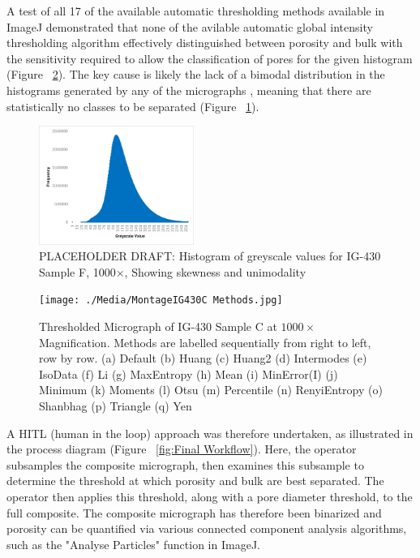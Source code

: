 \documentclass[3p,twocolumn]{elsarticle}
\begin{document}
A test of all 17 of the available automatic thresholding methods available in
ImageJ demonstrated that none of the avilable automatic global intensity
thresholding algorithm effectively distinguished between porosity and bulk
with the sensitivity required to allow the classification of pores for the
given histogram (Figure ~\ref{fig:Try All Thresholding Methods}). The key
cause is likely the lack of a bimodal distribution in the histograms generated
by any of the micrographs , meaning that there are statistically no classes to
be separated (Figure ~\ref{fig:histogramnobimodal}). 

    \begin{figure}
		\centering
    \includegraphics[width=0.45\textwidth]{./Media/IG430F Greyscale Histogram.png}
		\caption{PLACEHOLDER DRAFT: Histogram of greyscale values for IG-430 Sample F, 1000×, Showing skewness and unimodality}
		\label{fig:histogramnobimodal}
	\end{figure} 

	\begin{figure}[!htbp]
		\centering
		\texttt{[image: ./Media/MontageIG430C Methods.jpg]}
		\caption{Thresholded Micrograph of IG-430 Sample C at $1000\times$ Magnification. Methods are labelled sequentially from right to left, row by row. (a) Default
			(b) Huang
			(c) Huang2
			(d) Intermodes
			(e) IsoData
			(f) Li
			(g) MaxEntropy
			(h) Mean
			(i) MinError(I)
			(j) Minimum
			(k) Moments
			(l) Otsu
			(m) Percentile
			(n) RenyiEntropy
			(o) Shanbhag
			(p) Triangle
			(q) Yen}
		\label{fig:Try All Thresholding Methods}
	\end{figure}  

	A HITL (human in the loop) approach was therefore undertaken, as illustrated
	in the  process diagram (Figure ~\ref{fig:Final Workflow}). Here, the operator
	subsamples the composite micrograph, then examines this subsample to
	determine the threshold at which porosity and bulk are best separated. The
	operator then applies this threshold, along with a pore diameter threshold, to
	the full composite. The composite micrograph has therefore been binarized and 
  porosity can be quantified via various connected component analysis
  algorithms, such as the "Analyse Particles" function in ImageJ.
\end{document}
